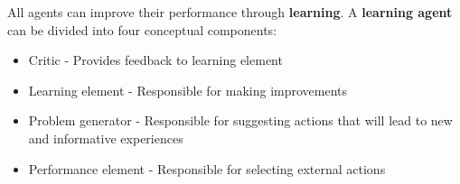 \documentclass{article}
\begin{document}
All agents can improve their performance through \textbf{learning}. A \textbf{learning agent} can be divided into four conceptual components:
\begin{itemize}
    \item Critic - Provides feedback to learning element
    \item Learning element - Responsible for making improvements
    \item Problem generator - Responsible for suggesting actions that will lead to new and informative experiences
    \item Performance element - Responsible for selecting external actions
\end{itemize}
\end{document}
